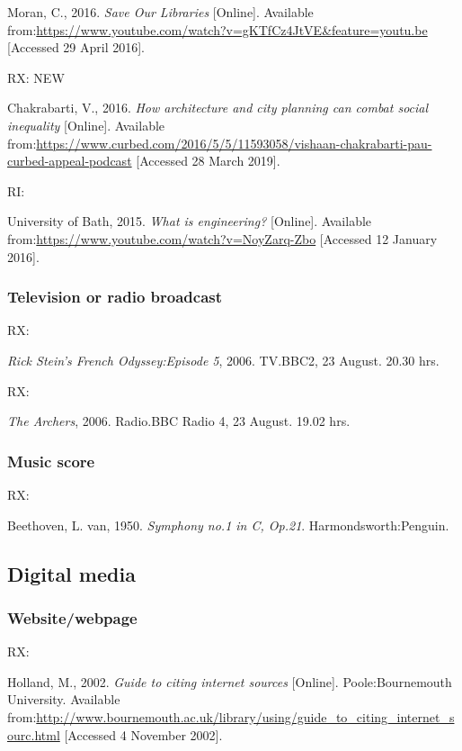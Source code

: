 Moran, C., 2016. \emph{Save Our Libraries} [Online]. Available from:\@ \url{https://www.youtube.com/watch?v=gKTfCz4JtVE&feature=youtu.be} [Accessed 29 April 2016].


RX: \cite{chakrabarti2016hac} NEW

Chakrabarti, V., 2016. \emph{How architecture and city planning can combat social inequality} [Online]. Available from:\@ \url{https://www.curbed.com/2016/5/5/11593058/vishaan-chakrabarti-pau-curbed-appeal-podcast} [Accessed 28 March 2019].


RI: \cite{uob2015wie}

University of Bath, 2015. \emph{What is engineering?} [Online]. Available from:\@ \url{https://www.youtube.com/watch?v=NoyZarq-Zbo} [Accessed 12 January 2016].



\subsubsection*{Television or radio broadcast}

RX: \cite{rsfo2006ep5}

\emph{Rick Stein's French Odyssey:\@ Episode 5}, 2006. TV.\@ BBC2, 23 August. 20.30 hrs.


RX: \cite{archers20060823}

\emph{The Archers}, 2006. Radio.\@ BBC Radio 4, 23 August. 19.02 hrs.



\subsubsection*{Music score}

RX: \cite{beethoven1950symph1}

Beethoven, L. van, 1950. \emph{Symphony no.1 in C, Op.21}. Harmondsworth:\@ Penguin.



\subsection{Digital media}

\subsubsection*{Website\slash webpage}

RX: \cite{holland2002gci}

Holland, M., 2002. \emph{Guide to citing internet sources} [Online]. Poole:\@ Bournemouth University. Available from:\@ \url{http://www.bournemouth.ac.uk/library/using/guide_to_citing_internet_sourc.html} [Accessed 4 November 2002].



